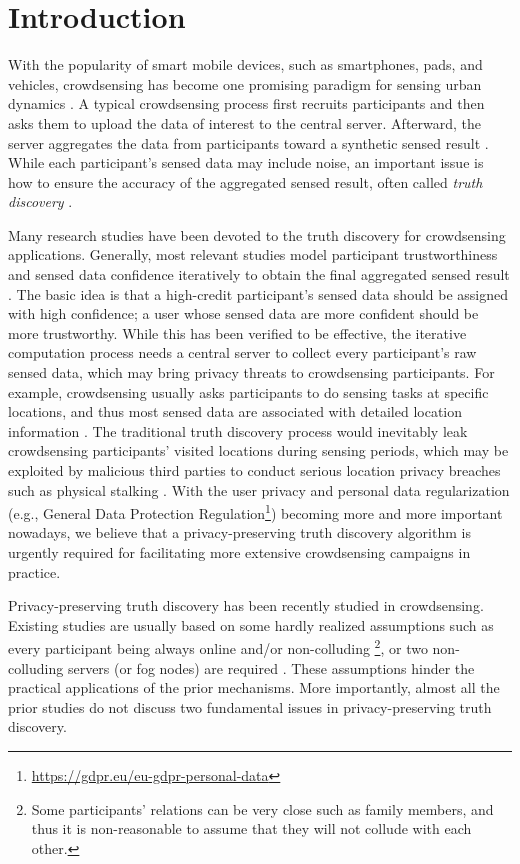 \section{Introduction}

With the popularity of smart mobile devices, such as smartphones, pads, and vehicles, crowdsensing has become one promising paradigm for sensing urban dynamics \citep{ganti2011mobile}. A typical crowdsensing process first recruits participants and then asks them to upload the data of interest to the central server. Afterward, the server aggregates the data from participants toward a synthetic sensed result \citep{zhang20144w1h,ma2014opportunities}. While each participant's sensed data may include noise, an important issue is how to ensure the accuracy of the aggregated sensed result, often called \textit{truth discovery} \citep{wang2012truth,meng2015truth,Wang2014SurrogateMS}.

Many research studies have been devoted to the truth discovery for crowdsensing applications. Generally, most relevant studies model participant trustworthiness and sensed data confidence iteratively to obtain the final aggregated sensed result \citep{yin2008truth}. The basic idea is that a high-credit participant's sensed data should be assigned with high confidence; a user whose sensed data are more confident should be more trustworthy. While this has been verified to be effective, the iterative computation process needs a central server to collect every participant's raw sensed data, which may bring privacy threats to crowdsensing participants. For example, crowdsensing usually asks participants to do sensing tasks at specific locations, and thus most sensed data are associated with detailed location information \citep{zhang20144w1h}. The traditional truth discovery process would inevitably leak crowdsensing participants' visited locations during sensing periods, which may be exploited by malicious third parties to conduct serious location privacy breaches such as physical stalking \citep{Primault2019TheLR}. With the user privacy and personal data regularization (e.g., General Data Protection Regulation\footnote{\url{https://gdpr.eu/eu-gdpr-personal-data}}) becoming more and more important nowadays, we believe that a privacy-preserving truth discovery algorithm is urgently required for facilitating more extensive crowdsensing campaigns in practice.

Privacy-preserving truth discovery has been recently studied in crowdsensing.  Existing studies are usually based on some hardly realized assumptions such as every participant being always online and/or non-colluding \citep{Miao2015CloudEnabledPT,Miao2017ALP,Miao2019PrivacyPreservingTD}\footnote{Some participants' relations can be very close such as family members, and thus it is non-reasonable to assume that they will not collude with each other.}, or two non-colluding servers (or fog nodes) are required \citep{Tang2018NonInteractivePT,Zheng2018LearningTT,Zhang2021ReliableAP,ZHANG2020101848}. These assumptions hinder the practical applications of the prior mechanisms. 
More importantly, almost all the prior studies do not discuss two fundamental issues in privacy-preserving truth discovery.


